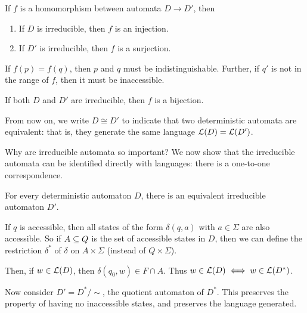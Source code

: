 \documentclass{article}
\begin{document}
\begin{proposition}
	\label{homomorphisms-on-irreducible-automata}
	If $f$ is a homomorphism between automata $D \to D'$, then
	\begin{enumerate}
		\item If $D$ is irreducible, then $f$ is an injection.
		\item If $D'$ is irreducible, then $f$ is a surjection.
	\end{enumerate}
\end{proposition}

\begin{prf}
	If $f(p) = f(q)$, then $p$ and $q$ must be indistinguishable. Further, if $q'$ is not in the range of $f$, then it must be inaccessible.
\end{prf}

\begin{corollary}
	If both $D$ and $D'$ are irreducible, then $f$ is a bijection.
\end{corollary}

From now on, we write $D \cong D'$ to indicate that two deterministic automata are equivalent: that is, they generate the same language $\mathcal{L}(D) = \mathcal{L}(D')$.

Why are irreducible automata so important? We now show that the irreducible automata can be identified directly with languages: there is a one-to-one correspondence.

\begin{theorem}
	\label{irreducible-automata-exist}
	For every deterministic automaton $D$, there is an equivalent irreducible automaton $D'$.
\end{theorem}

\begin{prf}
	If $q$ is accessible, then all states of the form $\delta(q, a)$ with $a \in \Sigma$ are also accessible. So if $A \subseteq Q$ is the set of accessible states in $D$, then we can define the restriction $\delta^*$ of $\delta$ on $A \times \Sigma$ (instead of $Q \times \Sigma$).
	    
	Then, if $w \in \mathcal{L}(D)$, then $\delta(q_0, w) \in F \cap A$. Thus $w \in \mathcal{L}(D) \iff w \in \mathcal{L}(D^*)$.
	    
	Now consider $D' = D^* / \sim$, the quotient automaton of $D^*$. This preserves the property of having no inaccessible states, and preserves the language generated.
\end{prf}
\end{document}
